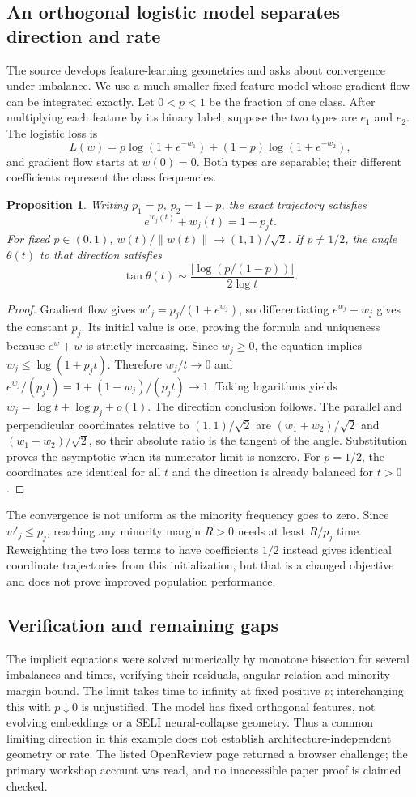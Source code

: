 \documentclass[11pt]{article}
\newtheorem{proposition}{Proposition}
\begin{document}
\subsection{An orthogonal logistic model separates direction and rate}
The source develops feature-learning geometries and asks about convergence under imbalance. We use a much smaller fixed-feature model whose gradient flow can be integrated exactly. Let $0<p<1$ be the fraction of one class. After multiplying each feature by its binary label, suppose the two types are $e_1$ and $e_2$. The logistic loss is
\[
L(w)=p\log(1+e^{-w_1})+(1-p)\log(1+e^{-w_2}),
\]
and gradient flow starts at $w(0)=0$. Both types are separable; their different coefficients represent the class frequencies.
\begin{proposition}
Writing $p_1=p$, $p_2=1-p$, the exact trajectory satisfies
\[
e^{w_j(t)}+w_j(t)=1+p_jt.
\]
For fixed $p\in(0,1)$, $w(t)/\|w(t)\|\to(1,1)/\sqrt2$. If $p\ne1/2$, the angle $\theta(t)$ to that direction satisfies
\[
\tan\theta(t)\sim\frac{|\log(p/(1-p))|}{2\log t}.
\]
\end{proposition}
\begin{proof}
Gradient flow gives $w'_j=p_j/(1+e^{w_j})$, so differentiating $e^{w_j}+w_j$ gives the constant $p_j$. Its initial value is one, proving the formula and uniqueness because $e^w+w$ is strictly increasing. Since $w_j\ge0$, the equation implies $w_j\le\log(1+p_jt)$. Therefore $w_j/t\to0$ and $e^{w_j}/(p_jt)=1+(1-w_j)/(p_jt)\to1$. Taking logarithms yields $w_j=\log t+\log p_j+o(1)$. The direction conclusion follows. The parallel and perpendicular coordinates relative to $(1,1)/\sqrt2$ are $(w_1+w_2)/\sqrt2$ and $(w_1-w_2)/\sqrt2$, so their absolute ratio is the tangent of the angle. Substitution proves the asymptotic when its numerator limit is nonzero. For $p=1/2$, the coordinates are identical for all $t$ and the direction is already balanced for $t>0$.
\end{proof}
The convergence is not uniform as the minority frequency goes to zero. Since $w'_j\le p_j$, reaching any minority margin $R>0$ needs at least $R/p_j$ time. Reweighting the two loss terms to have coefficients $1/2$ instead gives identical coordinate trajectories from this initialization, but that is a changed objective and does not prove improved population performance.
\subsection{Verification and remaining gaps}
The implicit equations were solved numerically by monotone bisection for several imbalances and times, verifying their residuals, angular relation and minority-margin bound. The limit takes time to infinity at fixed positive $p$; interchanging this with $p\downarrow0$ is unjustified. The model has fixed orthogonal features, not evolving embeddings or a SELI neural-collapse geometry. Thus a common limiting direction in this example does not establish architecture-independent geometry or rate. The listed OpenReview page returned a browser challenge; the primary workshop account was read, and no inaccessible paper proof is claimed checked.
\end{document}
